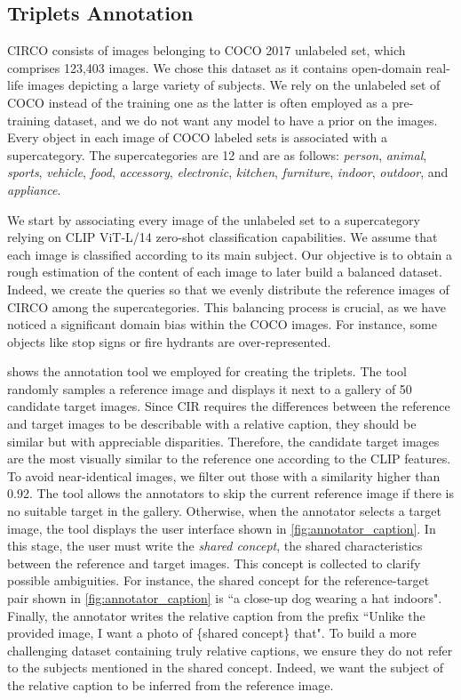 \documentclass[10pt,twocolumn,letterpaper]{article}
\begin{document}
\subsection{Triplets Annotation}\label{sec:triplets_annotation}
CIRCO consists of images belonging to COCO 2017 \cite{lin2014microsoft} unlabeled set, which comprises 123,403 images. We chose this dataset as it contains open-domain real-life images depicting a large variety of subjects. We rely on the unlabeled set of COCO instead of the training one as the latter is often employed as a pre-training dataset, and we do not want any model to have a prior on the images. Every object in each image of COCO labeled sets is associated with a supercategory. The supercategories are 12 and are as follows: \textit{person}, \textit{animal}, \textit{sports}, \textit{vehicle}, \textit{food}, \textit{accessory}, \textit{electronic}, \textit{kitchen}, \textit{furniture}, \textit{indoor}, \textit{outdoor}, and \textit{appliance}. 

We start by associating every image of the unlabeled set to a supercategory relying on CLIP ViT-L/14 zero-shot classification capabilities. We assume that each image is classified according to its main subject.  Our objective is to obtain a rough estimation of the content of each image to later build a balanced dataset. Indeed, we create the queries so that we evenly distribute the reference images of CIRCO among the supercategories.
This balancing process is crucial, as we have noticed a significant domain bias within the COCO images. For instance, some objects like stop signs or fire hydrants are over-represented.

 shows the annotation tool we employed for creating the triplets. 
The tool randomly samples a reference image and displays it next to a gallery of 50 candidate target images. 
Since CIR requires the differences between the reference and target images to be describable with a relative caption, they should be similar but with appreciable disparities. Therefore, the candidate target images are the most visually similar to the reference one according to the CLIP features. To avoid near-identical images, we filter out those with a similarity higher than 0.92. The tool allows the annotators to skip the current reference image if there is no suitable target in the gallery. Otherwise, when the annotator selects a target image, the tool displays the user interface shown in \cref{fig:annotator_caption}. In this stage, the user must write the \textit{shared concept}, \ie the shared characteristics between the reference and target images. This concept is collected to clarify possible ambiguities. For instance, the shared concept for the reference-target pair shown in \cref{fig:annotator_caption} is ``a close-up dog wearing a hat indoors". Finally, the annotator writes the relative caption from the prefix ``Unlike the provided image, I want a photo of \{shared concept\} that". To build a more challenging dataset containing truly relative captions, we ensure they do not refer to the subjects mentioned in the shared concept. Indeed, we want the subject of the relative caption to be inferred from the reference image. 
\end{document}
